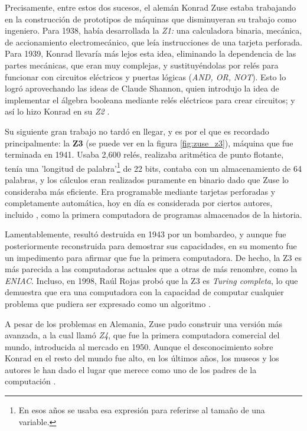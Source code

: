 \documentclass[letterpaper,12pt,oneside]{book}
\begin{document}
		
		Precisamente, entre estos dos sucesos, el alemán Konrad
		Zuse estaba trabajando en la construcción de prototipos de máquinas que disminuyeran su trabajo como ingeniero. Para 1938, había desarrollada la \textit{Z1:}
		una calculadora binaria, mecánica, de accionamiento electromecánico, que leía instrucciones de una tarjeta perforada. Para 1939, Konrad llevaría más lejos esta idea,
		eliminando la dependencia de las partes mecánicas, que eran muy complejas, y sustituyéndolas por relés para funcionar con circuitos eléctricos y
		puertas lógicas (\textit{AND, OR, NOT}). Esto lo logró aprovechando las ideas de Claude Shannon, quien introdujo la idea de implementar
		el álgebra booleana mediante relés eléctricos para crear circuitos; y así lo hizo Konrad en su \textit{Z2} \cite[p.206]{ifrah_universal_2001}.
  
		Su siguiente gran trabajo no tardó en llegar, y es por el que es recordado principalmente: la \textbf{Z3} (se puede ver en la figura \ref{fig:zuse_z3}), máquina que fue terminada en 1941. Usaba 2,600 relés, realizaba aritmética de punto flotante, tenía una 'longitud de palabra'\footnote{En esos años se usaba esa expresión para referirse al tamaño de una variable.} de 22 bits, contaba con un almacenamiento de 64 palabras, y los cálculos eran realizados puramente en binario dado que Zuse lo consideraba más eficiente. Era programable mediante tarjetas
		perforadas y completamente automática, hoy en día es considerada por ciertos autores, incluido \cite{oregan_brief_2012}, como la primera computadora de programas almacenados de la historia.
  
		
		Lamentablemente, resultó destruida en 1943 por un bombardeo, y aunque fue posteriormente reconstruida para demostrar sus capacidades, en su momento fue un impedimento para afirmar que fue la primera computadora. De hecho, la Z3 es más parecida a las computadoras actuales que a otras de más renombre, como
		la \textit{ENIAC}. Incluso, en 1998, Raúl Rojas probó que la Z3 es \textit{Turing completa}, lo que demuestra que era
		una computadora con la capacidad de computar cualquier problema que pudiera ser expresado como un algoritmo \cite{amt_generacion_nodate}.
  
        A pesar de los problemas en Alemania, Zuse pudo construir
		una versión más avanzada, a la cual llamó \textit{Z4}, que fue la primera computadora comercial del mundo, introducida al mercado en 1950. Aunque el desconocimiento
		sobre Konrad en el resto del mundo fue alto, en los últimos años, los museos y los autores le han dado el lugar que merece como uno de los padres de la computación \cite[p.206]{ifrah_universal_2001}.
		
\end{document}
